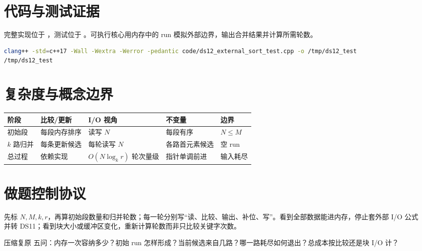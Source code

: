 \documentclass[UTF8,fontset=none,11pt,a4paper]{ctexart}
\begin{document}
\section{代码与测试证据}
完整实现位于 ，测试位于 。可执行核心用内存中的 run 模拟外部边界，输出合并结果并计算所需轮数。


\begin{lstlisting}[language=bash]
clang++ -std=c++17 -Wall -Wextra -Werror -pedantic code/ds12_external_sort_test.cpp -o /tmp/ds12_test
/tmp/ds12_test
\end{lstlisting}

\section{复杂度与概念边界}
\begin{center}\small
\begin{tabularx}{\linewidth}{L{2.8cm}C{1.8cm}C{1.8cm}YY}\toprule
阶段 & 比较/更新 & I/O 视角 & 不变量 & 边界\\\midrule
初始段 & 每段内存排序 & 读写 $N$ & 每段有序 & $N\le M$\\
$k$ 路归并 & 每条更新候选 & 每轮读写 $N$ & 各路首元素候选 & 空 run\\
总过程 & 依赖实现 & $O(N\log_k r)$ 轮次量级 & 指针单调前进 & 输入耗尽\\\bottomrule\end{tabularx}\end{center}

\section{做题控制协议}
先标 $N,M,k,r$，再算初始段数量和归并轮数；每一轮分别写“读、比较、输出、补位、写”。看到全部数据能进内存，停止套外部 I/O 公式并转 DS11；看到块大小或缓冲区变化，重新计算轮数而非只比较关键字次数。
\begin{corebox}{压缩复原}
五问：内存一次容纳多少？初始 run 怎样形成？当前候选来自几路？哪一路耗尽如何退出？总成本按比较还是块 I/O 计？
\end{corebox}
\end{document}
